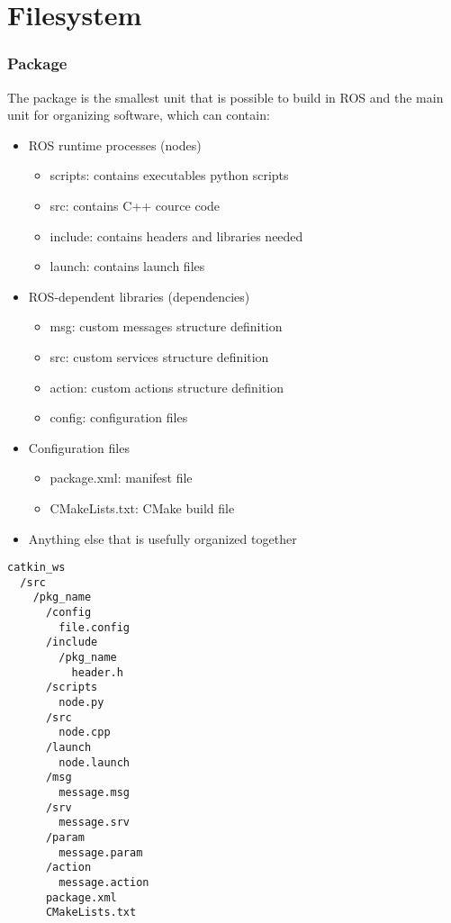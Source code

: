 \part{Filesystem}



\section{Package}

  The package is the smallest unit that is possible to build in ROS and the main unit for organizing software, which can contain:
  \begin{itemize}
      \item ROS runtime processes (nodes)
      \begin{itemize}
          \item scripts: contains executables python scripts
          \item src: contains C++ cource code
          \item include: contains headers and libraries needed
          \item launch: contains launch files
      \end{itemize}    
      \item ROS-dependent libraries (dependencies)
      \begin{itemize}
          \item msg: custom messages structure definition
          \item src: custom services structure definition
          \item action: custom actions structure definition
          \item config: configuration files
      \end{itemize}    
      \item Configuration files
      \begin{itemize}
          \item package.xml: manifest file
          \item CMakeLists.txt: CMake build file
      \end{itemize}
      \item Anything else that is usefully organized together
  \end{itemize}    

\begin{verbatim}
catkin_ws
  /src
    /pkg_name
      /config
        file.config
      /include
        /pkg_name
          header.h
      /scripts
        node.py
      /src
        node.cpp
      /launch
        node.launch
      /msg
        message.msg
      /srv
        message.srv
      /param
        message.param
      /action
        message.action
      package.xml
      CMakeLists.txt
\end{verbatim}




